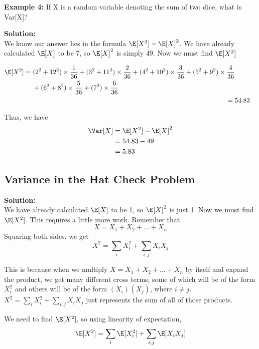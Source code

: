 \textbf{Example 4:}
If X is a random variable denoting the sum of two dice, what is Var[X]?

\vspace{2.5mm}

\textbf{Solution:} \\
We know our answer lies in the formula $\E[X^{2}] - \E[X]^{2}$. We have already calculated $\E[X]$ to be 7, so $\E[X]^{2}$ is simply 49.
Now we must find $\E[X^{2}]$

\begin{align*}
    \begin{split}
        \E[X^{2}] ={}& (2^{2} + 12^{2}) \times \frac{1}{36} + (3^{2} + 11^{2}) \times \frac{2}{36} + (4^{2} + 10^{2}) \times \frac{3}{36} + (5^{2} + 9^{2}) \times \frac{4}{36} \\
        & + (6^{2} + 8^{2}) \times \frac{5}{36} + (7^{2}) \times \frac{6}{36}
    \end{split} \\
    ={}& 54.83
\end{align*}

Thus, we have
\begin{align*}
    \Var[X] &= \E[X^{2}] - \E[X]^{2} \\
    &= 54.83 - 49 \\
    &= 5.83
\end{align*}

\subsection*{Variance in the Hat Check Problem}
\textbf{Solution:}\\
We have already calculated $\E[X]$ to be 1, so $\E[X]^{2}$ is just 1. Now we must find $\E[X^{2}]$. This requires a little more work. Remember that
    $$
    X = X_{1} + X_{2} + \ldots + X_{n}
    $$
Squaring both sides, we get
    $$
    X^{2} = \sum_{i}X_{i}^{2} + \sum_{i,j}X_{i}X_{j}
    $$
    
This is because when we multiply $X = X_{1} + X_{2} + \ldots + X_{n}$ by itself and expand the product, we get many different cross terms, some of which will be of the form $X_{i}^{2}$ and others will be of the form $(X_{i})(X_{j})$, where $i \neq j$. $X^{2} = \sum\limits_{i}X_{i}^{2} + \sum\limits_{i,j}X_{i}X_{j}$ just represents the sum of all of those products.

\vspace{2.5mm}

We need to find $\E[X^{2}]$, so using linearity of expectation,
    $$
    \E[X^{2}] = \sum_{i}\E[X_{i}^{2}] + \sum_{i,j}\E[X_{i}X_{j}]
    $$

